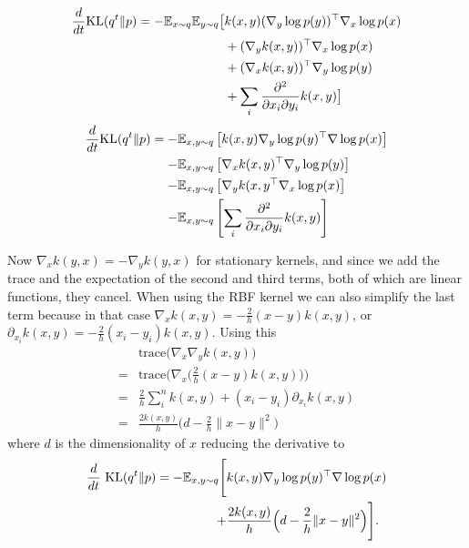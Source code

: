 \documentclass{article}
\begin{document}
    \begin{align}
        \frac{d}{dt} \text{\textrm{KL}}( q^t \| p ) = - \mathbb{E}_{x\sim q} \mathbb{E}_{y \sim q} \big[
            & k(x,y) (\nabla_y \log p(y))^\top \nabla_x \log p(x) \\
            &+ (\nabla_y k(x,y) )^\top \nabla_x \log p(x) \\
            &+ (\nabla_x k(x,y) )^\top \nabla_y \log p(y) \\
            &+ \sum_i \frac{ \partial^2 }{ \partial x_i \partial y_i } k(x,y) \big]
    \end{align}
    \begin{align}
        \frac{d}{dt} \text{\textrm{KL}} ( q^t \| p ) =
        -& \mathbb{E}_{x,y\sim q} \left[ k(x,y) \nabla_y \log p(y)^\top \nabla \log p(x) \right] \\ 
        -& \mathbb{E}_{x,y\sim q} \left[ \nabla_x k(x,y)^\top \nabla_y \log p(y) \right] \\ 
        -& \mathbb{E}_{x,y\sim q} \left[ \nabla_y k(x,y^\top \nabla_x \log p(x) \right] \\ 
        -& \mathbb{E}_{x,y\sim q} \left[ \sum_i \frac{ \partial^2 }{ \partial x_i \partial y_i } k(x,y) \right]
    \end{align}

    Now $\nabla_x k(y,x) = - \nabla_y k(y,x)$ for stationary kernels, and since we add the trace and the expectation of 
    the second and third terms, both of which are linear functions, they cancel.
    When using the RBF kernel we can also simplify the last term because in that case $\nabla_x k(x,y) = -\frac{2}{h} (x-y) k(x,y) $,
    or $\partial_{x_i} k(x,y) = -\frac{2}{h} (x_i - y_i) k(x,y)$. Using this 
    \begin{align}
        &\text{trace} \Big( \nabla_x \nabla_y k(x,y) \Big) \\
        = &\text{trace} \Big( \nabla_x \big( \frac{2}{h} (x-y)k(x,y) \big) \Big) \\
        = &\frac{2}{h} \sum_{i}^{n} k(x,y) + (x_i - y_i) \partial_{x_i} k(x,y) \\
        = & \frac{2k(x,y)}{h}\Big( d - \frac{2}{h}\|x-y\|^2 \Big)
    \end{align}
    where $d$ is the dimensionality of $x$
    reducing the derivative to
    \begin{align}
        \frac{d}{dt}\ \textrm{KL}( q^t \| p ) = - \mathbb{E}_{x,y\sim q} \Bigg[ &k(x,y) \nabla_y \log p(y)^\top \nabla \log p(x) \\ 
        +& \frac{2k(x,y)}{h}\Big( d - \frac{2}{h}\|x-y\|^2 \Big)\Bigg].
    \end{align}
\end{document}
